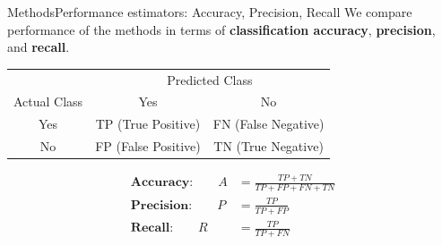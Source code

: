 \documentclass[xcolor=table]{beamer}
\numberwithin{figure}{section}
\numberwithin{equation}{section}
\begin{document}
\begin{frame}{Methods}{Performance estimators: Accuracy, Precision, Recall}
We compare performance of the methods in terms of  \textbf{classification accuracy}, \textbf{precision}, and \textbf{recall}.
\begin{table}[]
\begin{tabular}{|c|c|c|}
\hline
                               & \multicolumn{2}{c|}{Predicted Class}                                                      \\ \cline{2-3} 
\multirow{-2}{*}{Actual Class} & \cellcolor[HTML]{CBCEFB}Yes                 & \cellcolor[HTML]{CBCEFB}No                  \\ \hline
\cellcolor[HTML]{CBCEFB}Yes    & \cellcolor[HTML]{32CB00}TP (True Positive)  & \cellcolor[HTML]{FD6864}FN (False Negative) \\ \hline
\cellcolor[HTML]{CBCEFB}No     & \cellcolor[HTML]{FD6864}FP (False Positive) & \cellcolor[HTML]{32CB00}TN (True Negative)  \\ \hline
\end{tabular}
\end{table}
\begin{equation*}
\begin{split}
\textbf{Accuracy:}\qquad A&=\frac{TP+TN}{TP+FP+FN+TN} \\
\textbf{Precision:}\qquad P&=\frac{TP}{TP+FP}\\
\textbf{Recall:}\qquad R&=\frac{TP}{TP+FN}
\end{split}
\end{equation*}
\end{frame}
\end{document}
